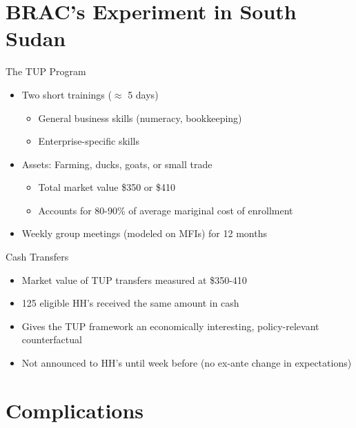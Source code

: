 \documentclass[t,presentation]{beamer}
\begin{document}
\section*{BRAC's Experiment in South Sudan}
\label{sec:orgheadline9}

\begin{frame}[label={sec:orgheadline7}]{The TUP Program}
\begin{itemize}
\item Two short trainings (\(\approx\) 5 days)

\begin{itemize}
\item General business skills (numeracy, bookkeeping)
\item Enterprise-specific skills
\end{itemize}

\item Assets: Farming, ducks, goats, or small trade

\begin{itemize}
\item Total market value \$350 or \$410
\item Accounts for 80-90\% of average mariginal cost of enrollment
\end{itemize}

\item Weekly group meetings (modeled on MFIs) for 12 months
\end{itemize}
\end{frame}

\begin{frame}[label={sec:orgheadline8}]{Cash Transfers}
\begin{itemize}
\item Market value of TUP transfers measured at \$350-410

\item 125 eligible HH's received the same amount in cash

\item Gives the TUP framework an economically interesting, policy-relevant counterfactual

\item Not announced to HH's until week before (no ex-ante change in expectations)
\end{itemize}
\end{frame}

\section*{Complications}
\label{sec:orgheadline12}
\end{document}
